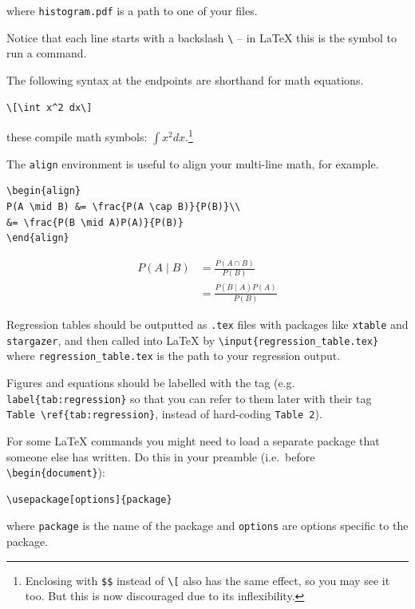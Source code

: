\documentclass[]{book}
\let\rmarkdownfootnote\footnote%
\def\footnote{\protect\rmarkdownfootnote}
\theoremstyle{definition}
\theoremstyle{definition}
\theoremstyle{definition}
\theoremstyle{remark}
\begin{document}
where \texttt{histogram.pdf} is a path to one of your files.

Notice that each line starts with a backslash \texttt{\textbackslash{}} -- in LaTeX this is the symbol to run a command.

The following syntax at the endpoints are shorthand for math equations.

\begin{verbatim}
\[\int x^2 dx\]
\end{verbatim}

these compile math symbols: \(\displaystyle \int x^2 dx.\)\footnote{Enclosing with \texttt{\$\$} instead of \texttt{\textbackslash{}{[}} also has the same effect, so you may see it too. But this is now discouraged due to its inflexibility.}

The \texttt{align} environment is useful to align your multi-line math, for example.

\begin{verbatim}
\begin{align}
P(A \mid B) &= \frac{P(A \cap B)}{P(B)}\\
&= \frac{P(B \mid A)P(A)}{P(B)}
\end{align}
\end{verbatim}

\begin{align}
P(A \mid B) &= \frac{P(A \cap B)}{P(B)}\\
&= \frac{P(B \mid A)P(A)}{P(B)}
\end{align}

Regression tables should be outputted as \texttt{.tex} files with packages like \texttt{xtable} and \texttt{stargazer}, and then called into LaTeX by \texttt{\textbackslash{}input\{regression\_table.tex\}} where \texttt{regression\_table.tex} is the path to your regression output.

Figures and equations should be labelled with the tag (e.g. \texttt{label\{tab:regression\}} so that you can refer to them later with their tag \texttt{Table\ \textbackslash{}ref\{tab:regression\}}, instead of hard-coding \texttt{Table\ 2}).

For some LaTeX commands you might need to load a separate package that someone else has written. Do this in your preamble (i.e.~before \texttt{\textbackslash{}begin\{document\}}):

\begin{verbatim}
\usepackage[options]{package}
\end{verbatim}

where \texttt{package} is the name of the package and \texttt{options} are options specific to the package.
\end{document}
